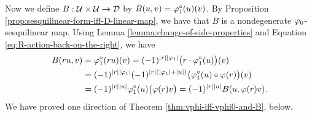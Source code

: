 


Now we define $B: \mathcal U\times \mathcal U \to \mathcal{D}$ by $B(u, v) = \varphi_1^\circ (u)(v)$. 
By Proposition \ref{prop:sesquilinear-form-iff-D-linear-map}, we have that $B$ is a nondegenerate $\varphi_0$-sesquilinear map. 
Using Lemma \ref{lemma:change-of-side-properties} and Equation \eqref{eq:R-action-back-on-the-right}, we have
%
\begin{equation*}
    \begin{split}
        B(ru,v) &= \varphi_1^\circ (ru)(v) = (-1)^{|r||\varphi_1|} \big(r \cdot \varphi_1^\circ (u) \big) (v)\\ &= (-1)^{|r||\varphi_1|} (-1)^{|r|(|\varphi_1| + |u|)} \big(\varphi_1^\circ (u) \circ \varphi(r) \big)(v) \\ &= (-1)^{|r||u|} \varphi_1^\circ (u) \big( \varphi(r)v \big)= (-1)^{|r||u|} B(u,\varphi(r)v).
    \end{split}
\end{equation*}
We have proved one direction of Theorem \ref{thm:vphi-iff-vphi0-and-B}, below. 

